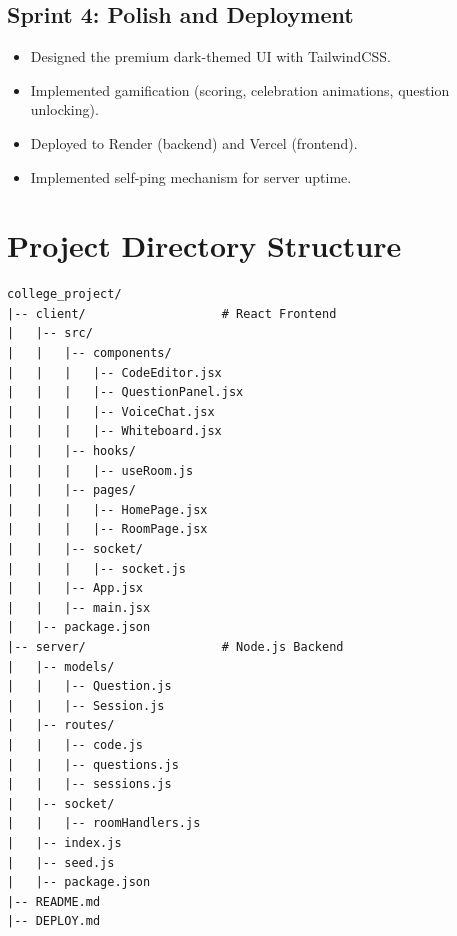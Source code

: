 \documentclass[12pt,a4paper,oneside]{report}
\begin{document}
\subsection{Sprint 4: Polish and Deployment}
\begin{itemize}
    \item Designed the premium dark-themed UI with TailwindCSS.
    \item Implemented gamification (scoring, celebration animations, question unlocking).
    \item Deployed to Render (backend) and Vercel (frontend).
    \item Implemented self-ping mechanism for server uptime.
\end{itemize}

\section{Project Directory Structure}

\begin{lstlisting}[language={}, caption={Figure 4.4: Project Directory Structure}]
college_project/
|-- client/                   # React Frontend
|   |-- src/
|   |   |-- components/
|   |   |   |-- CodeEditor.jsx
|   |   |   |-- QuestionPanel.jsx
|   |   |   |-- VoiceChat.jsx
|   |   |   |-- Whiteboard.jsx
|   |   |-- hooks/
|   |   |   |-- useRoom.js
|   |   |-- pages/
|   |   |   |-- HomePage.jsx
|   |   |   |-- RoomPage.jsx
|   |   |-- socket/
|   |   |   |-- socket.js
|   |   |-- App.jsx
|   |   |-- main.jsx
|   |-- package.json
|-- server/                   # Node.js Backend
|   |-- models/
|   |   |-- Question.js
|   |   |-- Session.js
|   |-- routes/
|   |   |-- code.js
|   |   |-- questions.js
|   |   |-- sessions.js
|   |-- socket/
|   |   |-- roomHandlers.js
|   |-- index.js
|   |-- seed.js
|   |-- package.json
|-- README.md
|-- DEPLOY.md
\end{lstlisting}




\end{document}
